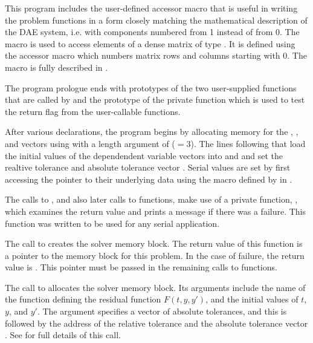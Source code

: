 This program includes the user-defined accessor macro
 that is useful in writing the problem functions in a form
closely matching the mathematical description of the DAE system,
i.e. with components numbered from 1 instead of from 0.
The  macro is used to access elements of a dense matrix of
type . It is defined using the {\dense} accessor macro
 which numbers matrix rows and columns starting with
0. The macro  is fully described in .

The program prologue ends with prototypes of the two user-supplied functions 
that are called by {\ida} and the prototype of the private function
 which is used to test the return flag from the {\ida}
user-callable functions.

After various declarations, the  program begins by
allocating memory for the , , and  vectors using
 with a length argument of  ($= 3$). The
lines following that load the initial values of the dependendent
variable vectors into  and  and set the realtive tolerance 
 and absolute tolerance vector . Serial  
values are set by first accessing the pointer to their underlying data using
the macro  defined by {\nvecs} in .

The calls to , and also later calls to 
functions, make use of a private function, , which examines
the return value and prints a message if there was a failure.  This
 function was written to be used for any serial {\sundials}
application.

The call to  creates the {\ida} solver memory block.
The return value of this function is a pointer to the memory block for this
problem.  In the case of failure, the return value is .  This
pointer must be passed in the remaining calls to {\ida} functions.

The call to  allocates the solver memory block.
Its arguments include the name of the {\C} function  defining the
residual function $F(t,y,y')$, and the initial values of $t$, $y$, and $y'$.
The argument  specifies a vector of absolute tolerances, and
this is followed by the address of the relative tolerance 
and the absolute tolerance vector .
See  for full details of this call.

